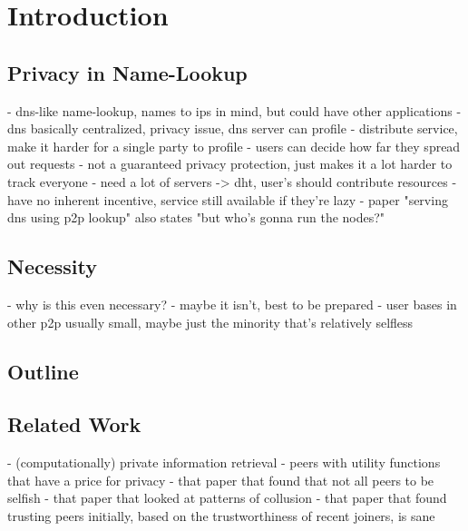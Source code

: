 \chapter{Introduction}
\section{Privacy in Name-Lookup}
- dns-like name-lookup, names to ips in mind, but could have other applications
- dns basically centralized, privacy issue, dns server can profile
- distribute service, make it harder for a single party to profile
- users can decide how far they spread out requests
- not a guaranteed privacy protection, just makes it a lot harder to track
  everyone
- need a lot of servers -> dht, user's should contribute resources
- have no inherent incentive, service still available if they're lazy
- paper "serving dns using p2p lookup" also states "but who's gonna run the
  nodes?"

\section{Necessity}
- why is this even necessary?
- maybe it isn't, best to be prepared
- user bases in other p2p usually small, maybe just the minority that's
  relatively selfless

\section{Outline}

\section{Related Work}
- (computationally) private information retrieval
- peers with utility functions that have a price for privacy
- that paper that found that not all peers to be selfish
- that paper that looked at patterns of collusion
- that paper that found trusting peers initially, based on the trustworthiness
  of recent joiners, is sane
